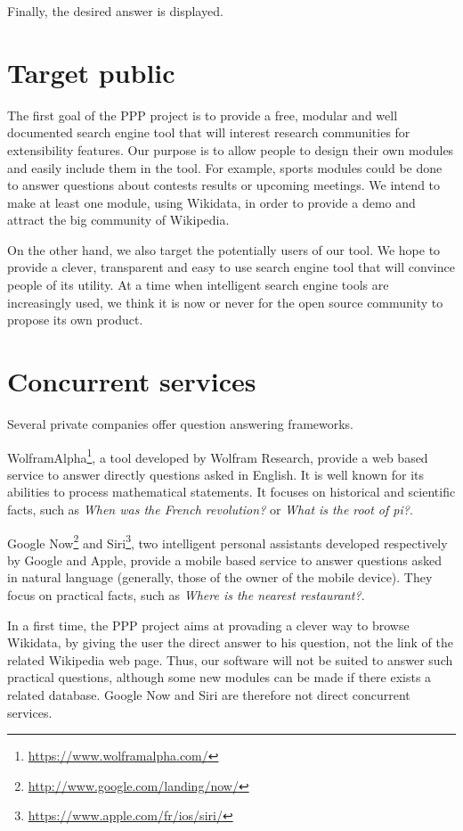 \documentclass[a4paper,10pt]{article}
\begin{document}
Finally, the desired answer is displayed.

\section{Target public}

The first goal of the PPP project is to provide a free, modular and well documented 
search engine tool that will 
interest research communities for extensibility features. Our purpose is to allow 
people to design their own modules and
easily include them in the tool. For example, sports modules could be done to answer
 questions about contests results or 
upcoming meetings. We intend to make at least one module, using Wikidata, in order 
to provide a demo and attract the big 
community of Wikipedia. 

On the other hand, we also target the potentially users of our tool. We hope to 
provide a clever, transparent and easy to use search 
engine tool that will convince people of its utility. At a time when intelligent 
search engine tools are increasingly used, we think it is
now or never for the open source community to propose its own product.

\section{Concurrent services}

Several private companies offer question answering frameworks. 

WolframAlpha\footnote{\url{https://www.wolframalpha.com/}}, a tool developed by 
Wolfram Research, provide a web based service to answer directly questions asked
in English. It is well known for its abilities to process mathematical statements.
It focuses on historical and scientific facts, such as \emph{When was the French 
revolution?} or \emph{What is the root of pi?}.

Google Now\footnote{\url{http://www.google.com/landing/now/}} and Siri\footnote{\url{https://www.apple.com/fr/ios/siri/}}, two intelligent personal assistants
developed respectively by Google and Apple, provide a mobile based service to 
answer questions asked in natural language (generally, those of the owner of the
mobile device). They focus on practical facts, such as \emph{Where is the nearest
restaurant?}.

In a first time, the PPP project aims at provading a clever way to browse Wikidata, by giving the 
user the direct answer to his question, not the link of the related Wikipedia
web page. Thus, our software will not be suited to answer such practical questions,
although some new modules can be made if there exists a related database. Google Now
and Siri are therefore not direct concurrent services.
\end{document}
